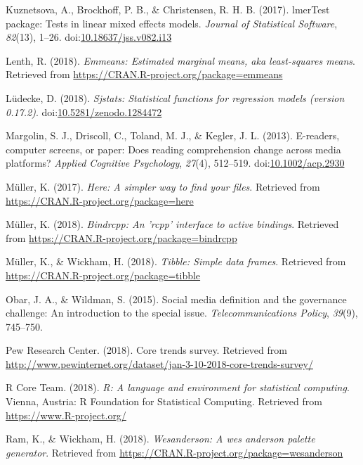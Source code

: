 \documentclass[man, fleqn, noextraspace]{apa6}
\theoremstyle{definition}
\theoremstyle{definition}
\theoremstyle{definition}
\theoremstyle{remark}
\begin{document}
\hypertarget{ref-R-lmerTest}{}
Kuznetsova, A., Brockhoff, P. B., \& Christensen, R. H. B. (2017).
lmerTest package: Tests in linear mixed effects models. \emph{Journal of
Statistical Software}, \emph{82}(13), 1--26.
doi:\href{https://doi.org/10.18637/jss.v082.i13}{10.18637/jss.v082.i13}

\hypertarget{ref-R-emmeans}{}
Lenth, R. (2018). \emph{Emmeans: Estimated marginal means, aka
least-squares means}. Retrieved from
\url{https://CRAN.R-project.org/package=emmeans}

\hypertarget{ref-R-sjstats}{}
Lüdecke, D. (2018). \emph{Sjstats: Statistical functions for regression
models (version 0.17.2)}.
doi:\href{https://doi.org/10.5281/zenodo.1284472}{10.5281/zenodo.1284472}

\hypertarget{ref-Margolin2013}{}
Margolin, S. J., Driscoll, C., Toland, M. J., \& Kegler, J. L. (2013).
E-readers, computer screens, or paper: Does reading comprehension change
across media platforms? \emph{Applied Cognitive Psychology},
\emph{27}(4), 512--519.
doi:\href{https://doi.org/10.1002/acp.2930}{10.1002/acp.2930}

\hypertarget{ref-R-here}{}
Müller, K. (2017). \emph{Here: A simpler way to find your files}.
Retrieved from \url{https://CRAN.R-project.org/package=here}

\hypertarget{ref-R-bindrcpp}{}
Müller, K. (2018). \emph{Bindrcpp: An 'rcpp' interface to active
bindings}. Retrieved from
\url{https://CRAN.R-project.org/package=bindrcpp}

\hypertarget{ref-R-tibble}{}
Müller, K., \& Wickham, H. (2018). \emph{Tibble: Simple data frames}.
Retrieved from \url{https://CRAN.R-project.org/package=tibble}

\hypertarget{ref-Obar2015}{}
Obar, J. A., \& Wildman, S. (2015). Social media definition and the
governance challenge: An introduction to the special issue.
\emph{Telecommunications Policy}, \emph{39}(9), 745--750.

\hypertarget{ref-Pew}{}
Pew Research Center. (2018). Core trends survey. Retrieved from
\url{http://www.pewinternet.org/dataset/jan-3-10-2018-core-trends-survey/}

\hypertarget{ref-R-base}{}
R Core Team. (2018). \emph{R: A language and environment for statistical
computing}. Vienna, Austria: R Foundation for Statistical Computing.
Retrieved from \url{https://www.R-project.org/}

\hypertarget{ref-R-wesanderson}{}
Ram, K., \& Wickham, H. (2018). \emph{Wesanderson: A wes anderson
palette generator}. Retrieved from
\url{https://CRAN.R-project.org/package=wesanderson}
\end{document}
